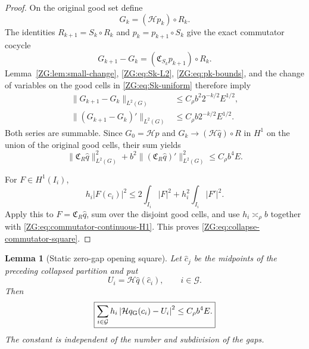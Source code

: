 \documentclass[11pt]{amsart}
\numberwithin{equation}{section}
\newtheorem{lemma}[theorem]{Lemma}
\theoremstyle{definition}
\theoremstyle{remark}
\newcommand{\Hil}{\mathcal H}
\begin{document}
\begin{proof}
On the original good set define
\[
 G_k=(\Hil p_k)\circ R_k.
\]
The identities $R_{k+1}=S_k\circ R_k$ and
$p_k=p_{k+1}\circ S_k$ give the exact commutator cocycle
\begin{equation}\label{ZG:eq:commutator-cocycle}
 G_{k+1}-G_k=(\mathfrak C_{S_k}p_{k+1})\circ R_k.
\end{equation}
Lemma~\ref{ZG:lem:small-change}, \eqref{ZG:eq:Sk-L2},
\eqref{ZG:eq:pk-bounds}, and the change of variables on the good cells in
\eqref{ZG:eq:Sk-uniform} therefore imply
\begin{align}
 \|G_{k+1}-G_k\|_{L^2(G)}
 &\le C_\rho b^2 2^{-k/2}E^{1/2},
 \label{ZG:eq:Gk-H0}\\
 \|(G_{k+1}-G_k)'\|_{L^2(G)}
 &\le C_\rho b 2^{-k/2}E^{1/2}.
 \label{ZG:eq:Gk-H1}
\end{align}
Both series are summable.  Since $G_0=\Hil p$ and
$G_k\to(\Hil\widehat q)\circ R$ in $H^1$ on the union of the original
good cells, their sum yields
\begin{equation}\label{ZG:eq:commutator-continuous-H1}
 \|\mathfrak C_R\widehat q\|_{L^2(G)}^2
 +b^2\|(\mathfrak C_R\widehat q)'\|_{L^2(G)}^2
 \le C_\rho b^4E.
\end{equation}

For $F\in H^1(I_i)$,
\[
 h_i|F(c_i)|^2
 \le2\int_{I_i}|F|^2+h_i^2\int_{I_i}|F'|^2.
\]
Apply this to $F=\mathfrak C_R\widehat q$, sum over the disjoint good
cells, and use $h_i\asymp_\rho b$ together with
\eqref{ZG:eq:commutator-continuous-H1}.  This proves
\eqref{ZG:eq:collapse-commutator-square}.
\end{proof}

\begin{lemma}[Static zero-gap opening square]\label{ZG:lem:opening}
Let
$\widehat c_j$ be the midpoints of the preceding collapsed partition and put
\begin{equation}\label{ZG:eq:reference-vector}
 U_i=\Hil\widehat q(\widehat c_i),\qquad i\in\mathcal G.
\end{equation}
Then
\begin{equation}\label{ZG:eq:opening-square}
 \boxed{
 \sum_{i\in\mathcal G}h_i
 \left|\Hil q_{\rm G}(c_i)-U_i\right|^2
 \le C_\rho b^4E.}
\end{equation}
The constant is independent of the number and subdivision of the gaps.
\end{lemma}
\end{document}
